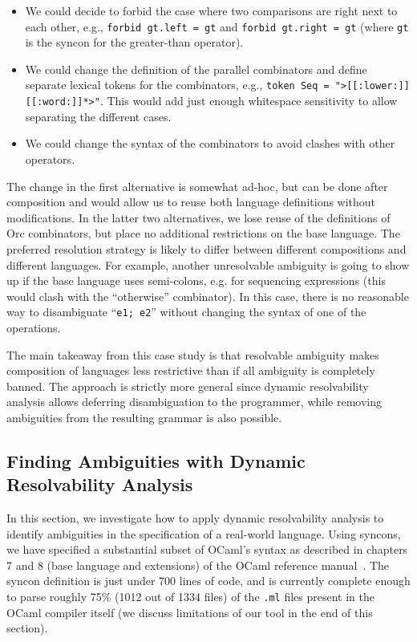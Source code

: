 \documentclass[acmsmall,review,anonymous]{acmart}\settopmatter{printfolios=true,printccs=false,printacmref=false}
\newcommand{\ocaml}{\lstinline[language={[objective]caml}]}
\newcommand{\syncon}{\lstinline[language=syncon]}
\begin{document}
\begin{itemize}
\item We could decide to forbid the case where two comparisons are
  right next to each other, e.g., \syncon{forbid gt.left = gt} and
  \syncon{forbid gt.right = gt} (where \syncon{gt} is the syncon
  for the greater-than operator).
\item We could change the definition of the parallel combinators
  and define separate lexical tokens for the combinators, e.g.,
  \syncon{token Seq = ">[[:lower:]][[:word:]]*>"}. This would add
  just enough whitespace sensitivity to allow separating the
  different cases.
\item We could change the syntax of the combinators to avoid
  clashes with other operators.
\end{itemize}

\noindent
The change in the first alternative is somewhat ad-hoc, but can be done after composition
and would allow us to reuse both language definitions without
modifications. In the latter two alternatives, we lose reuse of
the definitions of Orc combinators, but place no additional
restrictions on the base language. The preferred resolution
strategy is likely to differ between different compositions and
different languages.
%
For example, another unresolvable ambiguity is going to show up if
the base language uses semi-colons, e.g. for sequencing
expressions (this would clash with the ``otherwise'' combinator).
In this case, there is no reasonable way to disambiguate
``\ocaml{e1; e2}'' without changing the syntax of one of the
operations.

The main takeaway from this case study is that resolvable
ambiguity makes composition of languages less restrictive than if
all ambiguity is completely banned. The approach is strictly more
general since dynamic resolvability analysis allows deferring
disambiguation to the programmer, while removing ambiguities from
the resulting grammar is also possible.


\subsection{Finding Ambiguities with Dynamic Resolvability Analysis} \label{sec:evaluation-ocaml}

In this section, we investigate how to apply dynamic resolvability
analysis to identify ambiguities in the specification of a
real-world language.
%
Using syncons, we have specified a substantial subset of OCaml's
syntax as described in chapters 7 and 8 (base language and
extensions) of the OCaml reference manual~\cite{OCamlReference}.
The syncon definition is just under 700 lines of code, and is
currently complete enough to parse roughly 75\% (1012 out of 1334
files) of the \verb|.ml| files present in the OCaml compiler
itself (we discuss limitations of our tool in the end of this
section).
\end{document}
